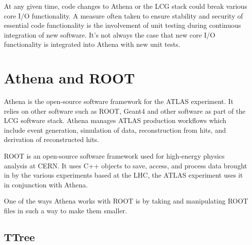 At any given time, code changes to Athena or the LCG stack could break various core I/O functionality. \cite{atlascollaboration2024softwarecomputingrun3}
A measure often taken to ensure stability and security of essential code functionality is the involvement of unit testing during continuous integration of new software. \cite{athenadocs_CIbuild}
It's not always the case that new core I/O functionality is integrated into Athena with new unit tests. 

\section{Athena and ROOT}
Athena is the open-source software framework for the ATLAS experiment.\cite{athena}
It relies on other software such as ROOT, Geant4 and other software as part of the LCG software stack. 
Athena manages ATLAS production workflows which include event generation, simulation of data, reconstruction from hits, and derivation of reconstructed hits.\cite{athenadocs}


ROOT is an open-source software framework used for high-energy physics analysis at CERN.\cite{ROOT_about} 
It uses C++ objects to save, access, and process data brought in by the various experiments based at the LHC, the ATLAS experiment uses it in conjunction with Athena.


One of the ways Athena works with ROOT is by taking and manipulating ROOT files in such a way to make them smaller. 


\subsection{TTree}

